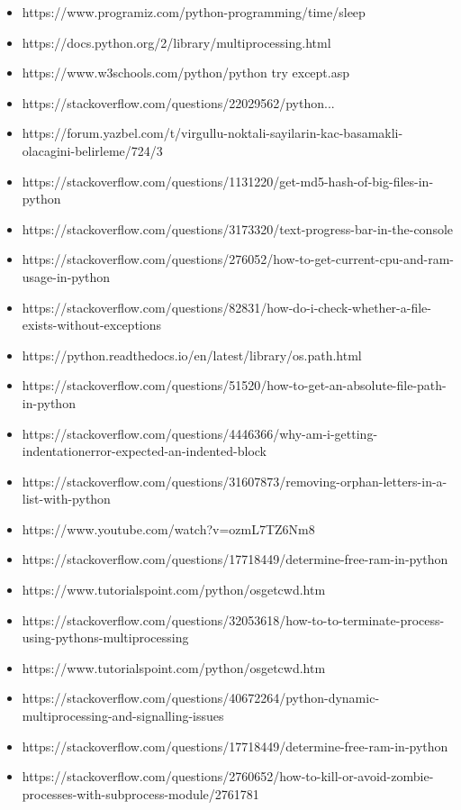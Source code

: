 \documentclass[onecolumn]{article}
\begin{document}
\begin{itemize}
\item https://www.programiz.com/python-programming/time/sleep
\item https://docs.python.org/2/library/multiprocessing.html
\item https://www.w3schools.com/python/python try except.asp
\item https://stackoverflow.com/questions/22029562/python...
\item https://forum.yazbel.com/t/virgullu-noktali-sayilarin-kac-basamakli-olacagini-belirleme/724/3
\item https://stackoverflow.com/questions/1131220/get-md5-hash-of-big-files-in-python
\item https://stackoverflow.com/questions/3173320/text-progress-bar-in-the-console
\item https://stackoverflow.com/questions/276052/how-to-get-current-cpu-and-ram-usage-in-python
\item https://stackoverflow.com/questions/82831/how-do-i-check-whether-a-file-exists-without-exceptions
\item https://python.readthedocs.io/en/latest/library/os.path.html
\item https://stackoverflow.com/questions/51520/how-to-get-an-absolute-file-path-in-python
\item https://stackoverflow.com/questions/4446366/why-am-i-getting-indentationerror-expected-an-indented-block
\item https://stackoverflow.com/questions/31607873/removing-orphan-letters-in-a-list-with-python
\item https://www.youtube.com/watch?v=ozmL7TZ6Nm8
\item https://stackoverflow.com/questions/17718449/determine-free-ram-in-python
\item https://www.tutorialspoint.com/python/osgetcwd.htm
\item https://stackoverflow.com/questions/32053618/how-to-to-terminate-process-using-pythons-multiprocessing
\item https://www.tutorialspoint.com/python/osgetcwd.htm
\item https://stackoverflow.com/questions/40672264/python-dynamic-multiprocessing-and-signalling-issues
\item https://stackoverflow.com/questions/17718449/determine-free-ram-in-python
\item https://stackoverflow.com/questions/2760652/how-to-kill-or-avoid-zombie-processes-with-subprocess-module/2761781

\end{itemize}
\end{document}
